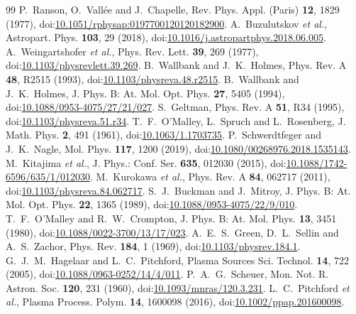 \documentclass[11pt]{article}
\numberwithin{equation}{section}
\begin{document}
\begin{thebibliography}{99}
 P.~Ranson, O.~Vall\'ee and J.~Chapelle, Rev. Phys. Appl. (Paris) \textbf{12}, 1829 (1977), doi:\href{https://doi.org/10.1051/rphysap:0197700120120182900}{10.1051/rphysap:0197700120120182900}.
 A.~Buzulutskov \emph{et al.}, Astropart. Phys. \textbf{103}, 29 (2018), doi:\href{https://doi.org/10.1016/j.astropartphys.2018.06.005}{10.1016/j.astropartphys.2018.06.005}.
 A.~Weingartshofer \emph{et al.}, Phys. Rev. Lett. \textbf{39}, 269 (1977), doi:\href{https://doi.org/10.1103/physrevlett.39.269}{10.1103/physrevlett.39.269}.
 B.~Wallbank and J.~K.~Holmes, Phys. Rev. A \textbf{48}, R2515 (1993), doi:\href{https://doi.org/10.1103/physreva.48.r2515}{10.1103/physreva.48.r2515}.
 B.~Wallbank and J.~K.~Holmes, J. Phys. B: At. Mol. Opt. Phys. \textbf{27}, 5405 (1994), doi:\href{https://doi.org/10.1088/0953-4075/27/21/027}{10.1088/0953-4075/27/21/027}.
 S.~Geltman, Phys. Rev. A \textbf{51}, R34 (1995), doi:\href{https://doi.org/10.1103/physreva.51.r34}{10.1103/physreva.51.r34}.
 T.~F.~O'Malley, L.~Spruch and L.~Rosenberg, J. Math. Phys. \textbf{2}, 491 (1961), doi:\href{https://doi.org/10.1063/1.1703735}{10.1063/1.1703735}.
 P.~Schwerdtfeger and J.~K.~Nagle, Mol. Phys. \textbf{117}, 1200 (2019), doi:\href{https://doi.org/10.1080/00268976.2018.1535143}{10.1080/00268976.2018.1535143}.
 M.~Kitajima \emph{et al.}, J. Phys.: Conf. Ser. \textbf{635}, 012030 (2015), doi:\href{https://doi.org/10.1088/1742-6596/635/1/012030}{10.1088/1742-6596/635/1/012030}.
 M.~Kurokawa \emph{et al.}, Phys. Rev. A \textbf{84}, 062717 (2011), doi:\href{https://doi.org/10.1103/physreva.84.062717}{10.1103/physreva.84.062717}.
 S.~J.~Buckman and J.~Mitroy, J. Phys. B: At. Mol. Opt. Phys. \textbf{22}, 1365 (1989), doi:\href{https://doi.org/10.1088/0953-4075/22/9/010}{10.1088/0953-4075/22/9/010}.
 T.~F.~O'Malley and R.~W.~Crompton, J. Phys. B: At. Mol. Phys. \textbf{13}, 3451 (1980), doi:\href{https://doi.org/10.1088/0022-3700/13/17/023}{10.1088/0022-3700/13/17/023}.
 A.~E.~S.~Green, D.~L.~Sellin and A.~S.~Zachor, Phys. Rev. \textbf{184}, 1 (1969), doi:\href{https://doi.org/10.1103/physrev.184.1}{10.1103/physrev.184.1}.
 G.~J.~M.~Hagelaar and L.~C.~Pitchford, Plasma Sources Sci. Technol. \textbf{14}, 722 (2005), doi:\href{https://doi.org/10.1088/0963-0252/14/4/011}{10.1088/0963-0252/14/4/011}.
 P.~A.~G.~Scheuer, Mon. Not. R. Astron. Soc. \textbf{120}, 231 (1960), doi:\href{https://doi.org/10.1093/mnras/120.3.231}{10.1093/mnras/120.3.231}.
 L.~C.~Pitchford \emph{et al.}, Plasma Process. Polym. \textbf{14}, 1600098 (2016), doi:\href{https://doi.org/10.1002/ppap.201600098}{10.1002/ppap.201600098}.
\end{thebibliography}
\end{document}
